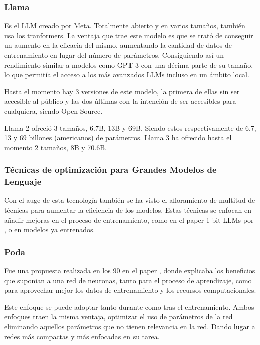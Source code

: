 \subsubsection{Llama}

Es el LLM creado por Meta. Totalmente abierto y en varios tamaños, también usa los tranformers. La ventaja que trae este modelo es que se trató de conseguir un aumento en la eficacia del mismo, aumentando la cantidad de datos de entrenamiento en lugar del número de parámetros. Consiguiendo así un rendimiento similar a modelos como GPT 3 con una décima parte de su tamaño, lo que permitía el acceso a los más avanzados LLMs incluso en un ámbito local.

Hasta el momento hay 3 versiones de este modelo, la primera de ellas sin ser accesible al público y las dos últimas con la intención de ser accesibles para cualquiera, siendo Open Source.

Llama 2 ofreció 3 tamaños, 6.7B, 13B y 69B. Siendo estos respectivamente de 6.7, 13 y 69 billones (americanos) de parámetros.
Llama 3 ha ofrecido hasta el momento 2 tamaños, 8B y 70.6B.

\subsubsection{Técnicas de optimización para Grandes Modelos de Lenguaje}

Con el auge de esta tecnología también se ha visto el afloramiento de multitud de técnicas para aumentar la eficiencia de los modelos. Estas técnicas se enfocan en añadir mejoras en el proceso de entrenamiento, como en el paper 1-bit LLMs por \cite{ma2024era}, o en modelos ya entrenados.

\subsubsection{Poda}

Fue una propuesta realizada en los 90 en el paper \cite{lecun1989optimal}, donde explicaba los beneficios que suponian a una red de neuronas, tanto para el proceso de aprendizaje, como para aprovechar mejor los datos de entrenamiento y los recursos computacionales.

Este enfoque se puede adoptar tanto durante como tras el entrenamiento. Ambos enfoques traen la misma ventaja, optimizar el uso de parámetros de la red eliminando aquellos parámetros que no tienen relevancia en la red. Dando lugar a redes más compactas y más enfocadas en su tarea.

